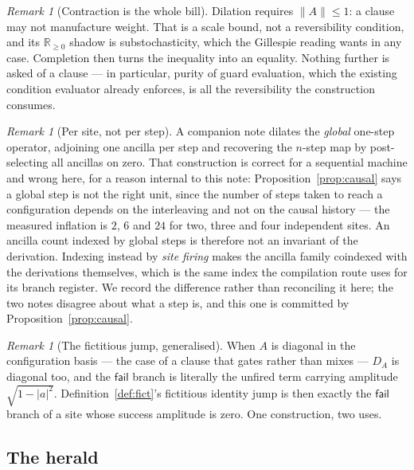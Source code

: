 \documentclass[11pt,a4paper]{article}
\theoremstyle{plain}
\theoremstyle{definition}
\theoremstyle{remark}
\newtheorem{remark}[theorem]{Remark}
\newcommand{\Rnn}{\mathbb{R}_{\geq 0}}
\begin{document}
\begin{remark}[Contraction is the whole bill]\label{rem:contraction}
Dilation requires $\|A\| \leq 1$: a clause may not manufacture weight. That is a
scale bound, not a reversibility condition, and its $\Rnn$ shadow is
substochasticity, which the Gillespie reading wants in any case. Completion then
turns the inequality into an equality. Nothing further is asked of a clause ---
in particular, purity of guard evaluation, which the existing condition
evaluator already enforces, is all the reversibility the construction consumes.
\end{remark}

\begin{remark}[Per site, not per step]\label{rem:persite}
A companion note dilates the \emph{global} one-step operator, adjoining one
ancilla per step and recovering the $n$-step map by post-selecting all ancillas
on zero. That construction is correct for a sequential machine and wrong here,
for a reason internal to this note: Proposition~\ref{prop:causal} says a global
step is not the right unit, since the number of steps taken to reach a
configuration depends on the interleaving and not on the causal history --- the
measured inflation is $2$, $6$ and $24$ for two, three and four independent
sites. An ancilla count indexed by global steps is therefore not an invariant of
the derivation. Indexing instead by \emph{site firing} makes the ancilla family
coindexed with the derivations themselves, which is the same index the
compilation route uses for its branch register. We record the difference rather
than reconciling it here; the two notes disagree about what a step is, and this
one is committed by Proposition~\ref{prop:causal}.
\end{remark}

\begin{remark}[The fictitious jump, generalised]\label{rem:fictitious}
When $A$ is diagonal in the configuration basis --- the case of a clause that
gates rather than mixes --- $D_A$ is diagonal too, and the $\mathsf{fail}$
branch is literally the unfired term carrying amplitude
$\sqrt{1-|a|^2}$. Definition~\ref{def:fict}'s fictitious identity jump is then
exactly the $\mathsf{fail}$ branch of a site whose success amplitude is zero.
One construction, two uses.
\end{remark}

\subsection{The herald}\label{ssec:herald}
\end{document}
